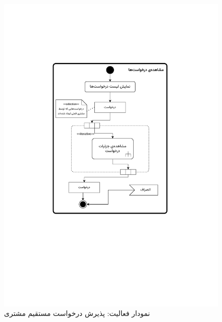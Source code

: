 \begin{figure}
	\centering
	\includegraphics[scale=0.8, page=4]{figs/OOD-activity11-20.pdf}
	\caption{نمودار فعالیت: پذیرش درخواست مستقیم مشتری}
\end{figure}
\FloatBarrier
\newpage

